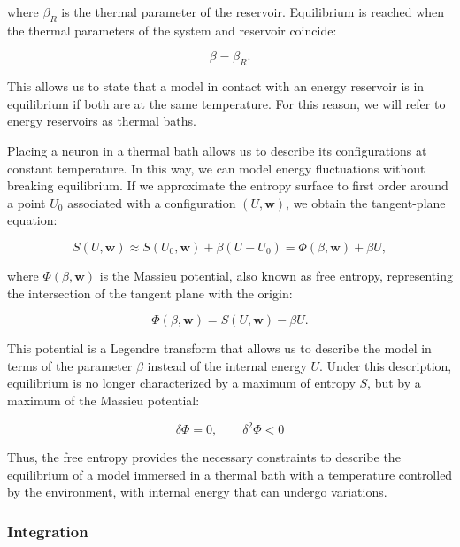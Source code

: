 \documentclass[12pt]{article}
\begin{document}
where $\beta_R$ is the thermal parameter of the reservoir. Equilibrium is reached when the thermal parameters of the system and reservoir coincide:

\begin{equation}
\beta = \beta_R.
\end{equation}

This allows us to state that a model in contact with an energy reservoir is in equilibrium if both are at the same temperature. For this reason, we will refer to energy reservoirs as thermal baths.

Placing a neuron in a thermal bath allows us to describe its configurations at constant temperature. In this way, we can model energy fluctuations without breaking equilibrium. If we approximate the entropy surface to first order around a point $U_0$ associated with a configuration $(U, \mathbf{w})$, we obtain the tangent-plane equation:

\begin{equation}
S(U, \mathbf{w}) \approx S(U_0,\mathbf{w}) + \beta(U-U_0) = \Phi(\beta, \mathbf{w}) + \beta U,
\end{equation}

where $\Phi(\beta, \mathbf{w})$ is the Massieu potential, also known as free entropy, representing the intersection of the tangent plane with the origin:

\begin{equation}
\Phi(\beta, \mathbf{w}) = S(U,\mathbf{w}) - \beta U.
\end{equation}

This potential is a Legendre transform that allows us to describe the model in terms of the parameter $\beta$ instead of the internal energy $U$. Under this description, equilibrium is no longer characterized by a maximum of entropy $S$, but by a maximum of the Massieu potential:

\begin{equation}
\delta \Phi = 0, \qquad \delta^2 \Phi < 0
\end{equation}

Thus, the free entropy provides the necessary constraints to describe the equilibrium of a model immersed in a thermal bath with a temperature controlled by the environment, with internal energy that can undergo variations.

\subsubsection{Integration}
\end{document}
